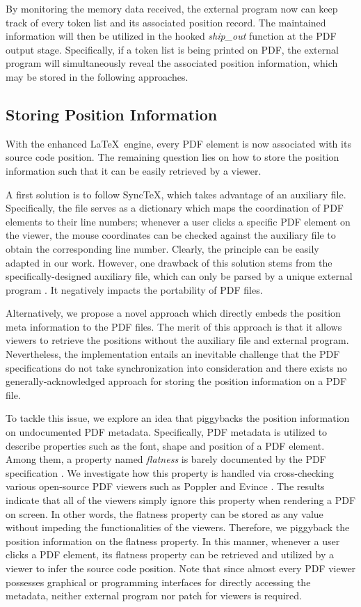 \documentclass[sigconf]{acmart}
\begin{document}
By monitoring the memory data received, the external program now can keep track of every token list and its associated position record. 
The maintained information will then be utilized in the hooked \textit{ship\_out} function at the PDF output stage.
Specifically, if a token list is being printed on PDF, the external program will simultaneously reveal the associated position information, which may be stored in the following approaches.

\subsection{Storing Position Information}
With the enhanced \LaTeX\ engine, every PDF element is now associated with its source code position. The remaining question lies on how to store the position information such that it can be easily retrieved by a viewer.

A first solution is to follow Sync\TeX , which takes advantage of an auxiliary file. 
Specifically, the file serves as a dictionary which maps the coordination of PDF elements to their line numbers; whenever a user clicks a specific PDF element on the viewer, the mouse coordinates can be checked against the auxiliary file to obtain the corresponding line number. 
Clearly, the principle can be easily adapted in our work. 
However, one drawback of this solution stems from the specifically-designed auxiliary file, which can only be parsed by a unique external program \cite{libsynctex2011}. It negatively impacts the portability of PDF files.

Alternatively, we propose a novel approach which directly embeds the position meta information to the PDF files. 
The merit of this approach is that it allows viewers to retrieve the positions without the auxiliary file and external program. 
Nevertheless, the implementation entails an inevitable challenge that the PDF specifications do not take synchronization into consideration and there exists no generally-acknowledged approach for storing the position information on a PDF file. 

To tackle this issue, we explore an idea that piggybacks the position information on undocumented PDF metadata. 
Specifically, PDF metadata is utilized to describe properties such as the font, shape and position of a PDF element. 
Among them, a property named \textit{flatness} is barely documented by the PDF specification \cite{libpdf2008}. 
We investigate how this property is handled via cross-checking various open-source PDF viewers such as Poppler\cite{libpoppler2008} and Evince \cite{libevince}. 
The results indicate that all of the viewers simply ignore this property when rendering a PDF on screen. 
In other words, the flatness property can be stored as any value without impeding the functionalities of the viewers. 
Therefore, we piggyback the position information on the flatness property.
In this manner, whenever a user clicks a PDF element, its flatness property can be retrieved and utilized  by a viewer to infer the source code position. 
Note that since almost every PDF viewer possesses graphical or programming interfaces for directly accessing the metadata, neither external program nor patch for viewers is required. 
\end{document}

